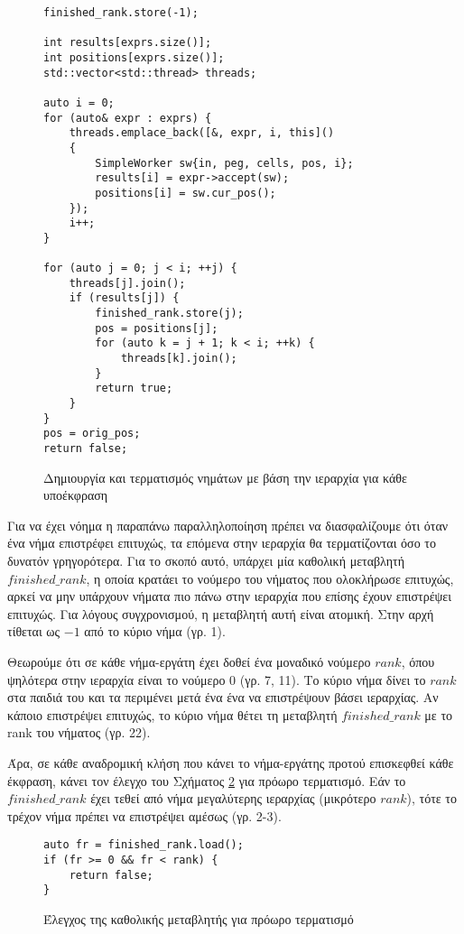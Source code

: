 \begin{figure}[h]
\setlength\partopsep{-\topsep}%
\begin{verbatim}
finished_rank.store(-1);

int results[exprs.size()];
int positions[exprs.size()];
std::vector<std::thread> threads;

auto i = 0;
for (auto& expr : exprs) { 
    threads.emplace_back([&, expr, i, this]()
    {
        SimpleWorker sw{in, peg, cells, pos, i};
        results[i] = expr->accept(sw);
        positions[i] = sw.cur_pos();
    });
    i++;
}

for (auto j = 0; j < i; ++j) {
    threads[j].join(); 
    if (results[j]) { 
        finished_rank.store(j);
        pos = positions[j];
        for (auto k = j + 1; k < i; ++k) {
            threads[k].join();
        }
        return true;
    }
}
pos = orig_pos;
return false;
\end{verbatim}
\caption{Δημιουργία και τερματισμός νημάτων με βάση την ιεραρχία για κάθε υποέκφραση}
\label{fig:top_down_1}
\end{figure}

Για να έχει νόημα η παραπάνω παραλληλοποίηση πρέπει να διασφαλίζουμε ότι όταν ένα νήμα επιστρέφει επιτυχώς, τα επόμενα στην ιεραρχία θα τερματίζονται όσο το δυνατόν γρηγορότερα.
Για το σκοπό αυτό, υπάρχει μία καθολική μεταβλητή $finished\_rank$, η οποία κρατάει το νούμερο του νήματος που ολοκλήρωσε επιτυχώς, αρκεί να μην υπάρχουν νήματα πιο πάνω στην ιεραρχία που επίσης έχουν επιστρέψει επιτυχώς.
Για λόγους συγχρονισμού, η μεταβλητή αυτή είναι ατομική.
Στην αρχή τίθεται ως $-1$ από το κύριο νήμα (γρ. 1).

Θεωρούμε ότι σε κάθε νήμα-εργάτη έχει δοθεί ένα μοναδικό νούμερο $rank$, όπου ψηλότερα στην ιεραρχία είναι το νούμερο $0$ (γρ. 7, 11).
Το κύριο νήμα δίνει το $rank$ στα παιδιά του και τα περιμένει μετά ένα ένα να επιστρέψουν βάσει ιεραρχίας.
Αν κάποιο επιστρέψει επιτυχώς, το κύριο νήμα θέτει τη μεταβλητή $finished\_rank$ με το rank του νήματος (γρ. 22).

Άρα, σε κάθε αναδρομική κλήση που κάνει το νήμα-εργάτης προτού επισκεφθεί κάθε έκφραση, κάνει τον έλεγχο του Σχήματος \ref{fig:top_down_2} για πρόωρο τερματισμό.
Εάν το $finished\_rank$ έχει τεθεί από νήμα μεγαλύτερης ιεραρχίας (μικρότερο $rank$), τότε το τρέχον νήμα πρέπει να επιστρέψει αμέσως (γρ. 2-3).

\begin{figure}[h]
\setlength\partopsep{-\topsep}%
\begin{verbatim}
auto fr = finished_rank.load();
if (fr >= 0 && fr < rank) { 
    return false;
}
\end{verbatim}
\caption{Έλεγχος της καθολικής μεταβλητής για πρόωρο τερματισμό}
\label{fig:top_down_2}
\end{figure}

